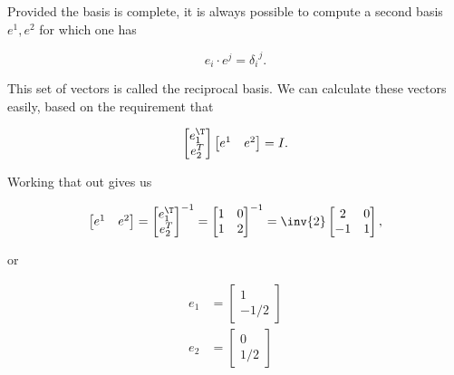 Provided the basis is complete, it is always possible to compute a second basis ${e^1, e^2}$ for which one has

\begin{equation}\label{eqn:grahamSchmidtLorentz:130}
e_i \cdot e^j = {\delta_i}^j.
\end{equation}

This set of vectors is called the reciprocal basis.  We can calculate these vectors easily, based on the requirement that

\begin{equation}\label{eqn:grahamSchmidtLorentz:150}
\begin{bmatrix}
e_1^\T \\
e_2^T
\end{bmatrix}
\begin{bmatrix}
e^1 & e^2
\end{bmatrix} = I.
\end{equation}

Working that out gives us

\begin{equation}\label{eqn:grahamSchmidtLorentz:170}
\begin{bmatrix}
e^1 & e^2
\end{bmatrix}
=
{
\begin{bmatrix}
e_1^\T \\
e_2^T
\end{bmatrix}
}^{-1}
= 
{\begin{bmatrix}
1 & 0 \\
1 & 2
\end{bmatrix}}^{-1}
= 
\inv{2} 
\begin{bmatrix}
2 & 0 \\
-1 & 1
\end{bmatrix},
\end{equation}

or

\begin{equation}\label{eqn:grahamSchmidtLorentz:190}
\begin{aligned}
e_1 &= 
\begin{bmatrix}
1 \\
-1/2
\end{bmatrix} \\
e_2 &= 
\begin{bmatrix}
0 \\
1/2
\end{bmatrix} 
\end{aligned}
\end{equation}

